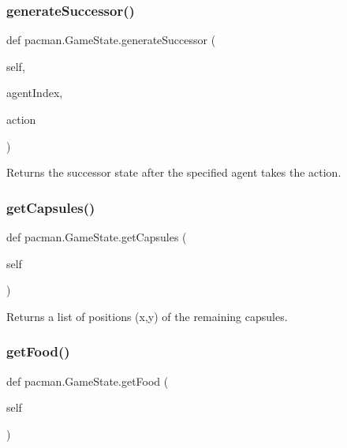 \subsubsection{\texorpdfstring{generate\+Successor()}{generateSuccessor()}}
{\footnotesize\ttfamily def pacman.\+Game\+State.\+generate\+Successor (\begin{DoxyParamCaption}\item[{}]{self,  }\item[{}]{agent\+Index,  }\item[{}]{action }\end{DoxyParamCaption})}

\begin{DoxyVerb}Returns the successor state after the specified agent takes the action.
\end{DoxyVerb}
 \mbox{\label{classpacman_1_1_game_state_a1221e5f48a5acae4f1794c352c8549e8}} 
\subsubsection{\texorpdfstring{get\+Capsules()}{getCapsules()}}
{\footnotesize\ttfamily def pacman.\+Game\+State.\+get\+Capsules (\begin{DoxyParamCaption}\item[{}]{self }\end{DoxyParamCaption})}

\begin{DoxyVerb}Returns a list of positions (x,y) of the remaining capsules.
\end{DoxyVerb}
 \mbox{\label{classpacman_1_1_game_state_a532341ee8ed3d7940681bc6d1c489253}} 
\subsubsection{\texorpdfstring{get\+Food()}{getFood()}}
{\footnotesize\ttfamily def pacman.\+Game\+State.\+get\+Food (\begin{DoxyParamCaption}\item[{}]{self }\end{DoxyParamCaption})}

